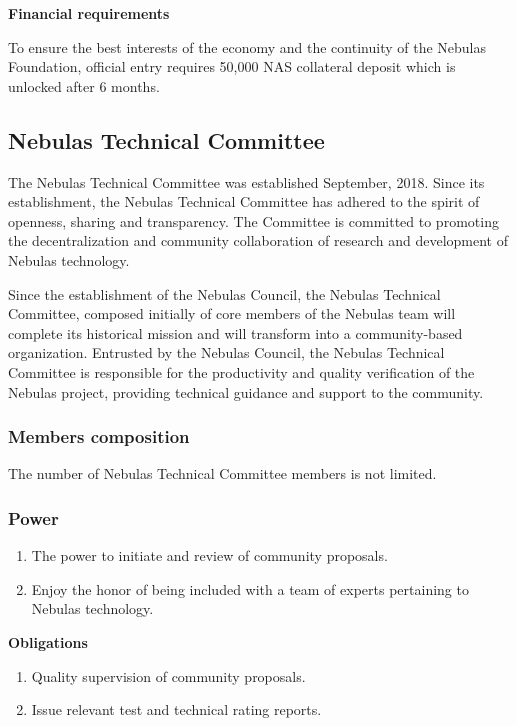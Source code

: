 \vspace{2em}

\textbf{Financial requirements}

To ensure the best interests of the economy and the continuity of the Nebulas Foundation, official entry requires 50,000 NAS collateral deposit which is unlocked after 6 months.

\subsection{Nebulas Technical Committee}

The Nebulas Technical Committee was established September, 2018. Since its establishment, the Nebulas Technical Committee has adhered to the spirit of openness, sharing and transparency. The Committee is committed to promoting the decentralization and community collaboration of research and development of Nebulas technology. 

Since the establishment of the Nebulas Council, the Nebulas Technical Committee, composed initially of core members of the Nebulas team will complete its historical mission and will transform into a community-based organization. Entrusted by the Nebulas Council, the Nebulas Technical Committee is responsible for the productivity and quality verification of the Nebulas project, providing technical guidance and support to the community.

\subsubsection{Members composition}

The number of Nebulas Technical Committee members is not limited.

\subsubsection{Power}

\begin{enumerate}
	\item The power to initiate and review of community proposals.
	\item Enjoy the honor of being included with a team of experts pertaining to Nebulas technology.
\end{enumerate}

\textbf{Obligations}

\begin{enumerate}
	\item Quality supervision of community proposals.
	\item Issue relevant test and technical rating reports.
\end{enumerate}

